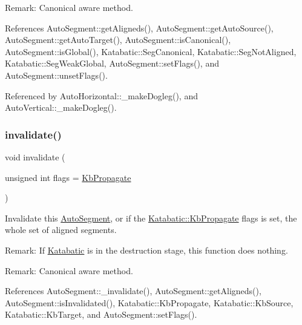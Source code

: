 \begin{DoxyParagraph}{Remark\+:}
Canonical aware method. 
\end{DoxyParagraph}


References Auto\+Segment\+::get\+Aligneds(), Auto\+Segment\+::get\+Auto\+Source(), Auto\+Segment\+::get\+Auto\+Target(), Auto\+Segment\+::is\+Canonical(), Auto\+Segment\+::is\+Global(), Katabatic\+::\+Seg\+Canonical, Katabatic\+::\+Seg\+Not\+Aligned, Katabatic\+::\+Seg\+Weak\+Global, Auto\+Segment\+::set\+Flags(), and Auto\+Segment\+::unset\+Flags().



Referenced by Auto\+Horizontal\+::\+\_\+make\+Dogleg(), and Auto\+Vertical\+::\+\_\+make\+Dogleg().

\mbox{\label{classKatabatic_1_1AutoSegment_a23599eee5a07af377fbc8d47cda7e7b0}} 
\subsubsection{\texorpdfstring{invalidate()}{invalidate()}}
{\footnotesize\ttfamily void invalidate (\begin{DoxyParamCaption}\item[{unsigned int}]{flags = {\ttfamily \hyperlink{namespaceKatabatic_a2af2ad6b6441614038caf59d04b3b217a3f95c1f06fe0b58b44ccbc57d99f2a5d}{Kb\+Propagate}} }\end{DoxyParamCaption})\hspace{0.3cm}{\ttfamily [virtual]}}

Invalidate this \hyperlink{classKatabatic_1_1AutoSegment}{Auto\+Segment}, or if the \hyperlink{namespaceKatabatic_a2af2ad6b6441614038caf59d04b3b217a3f95c1f06fe0b58b44ccbc57d99f2a5d}{Katabatic\+::\+Kb\+Propagate} flags is set, the whole set of aligned segments.

\begin{DoxyParagraph}{Remark\+:}
If \hyperlink{namespaceKatabatic}{Katabatic} is in the destruction stage, this function does nothing. 
\end{DoxyParagraph}
\begin{DoxyParagraph}{Remark\+:}
Canonical aware method. 
\end{DoxyParagraph}


References Auto\+Segment\+::\+\_\+invalidate(), Auto\+Segment\+::get\+Aligneds(), Auto\+Segment\+::is\+Invalidated(), Katabatic\+::\+Kb\+Propagate, Katabatic\+::\+Kb\+Source, Katabatic\+::\+Kb\+Target, and Auto\+Segment\+::set\+Flags().



